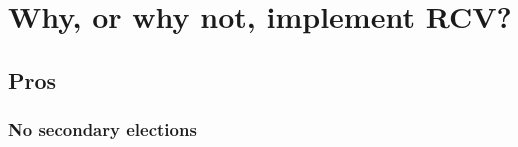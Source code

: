 \documentclass[12pt,twoside]{reedthesis}
\begin{document}
\hypertarget{why-or-why-not-implement-rcv}{%
\section{Why, or why not, implement RCV?}\label{why-or-why-not-implement-rcv}}

\hypertarget{pros}{%
\subsection{Pros}\label{pros}}

\hypertarget{no-secondary-elections}{%
\subsubsection{No secondary elections}\label{no-secondary-elections}}
\end{document}
